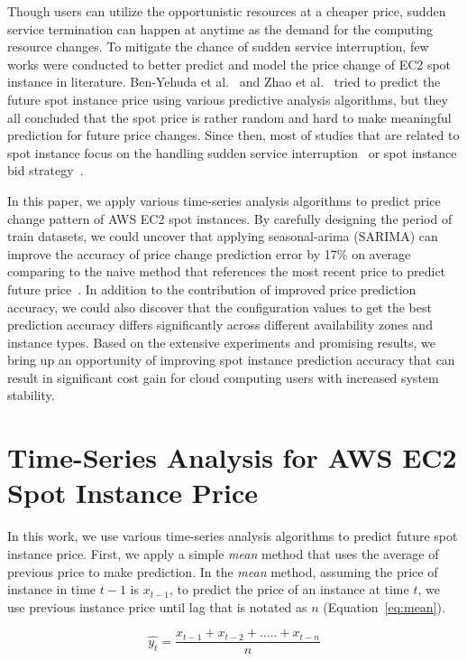 \documentclass[graybox]{svmult}
\begin{document}
Though users can utilize the opportunistic resources at a cheaper price, sudden service termination can happen at anytime as the demand for the computing resource changes. To mitigate the chance of sudden service interruption, few works were conducted to better predict and model the price change of EC2 spot instance in literature. Ben-Yehuda et al.~\cite{spot-instance-pricing-analysis} and Zhao et al.~\cite{spot-price-han-arima} tried to predict the future spot instance price using various predictive analysis algorithms, but they all concluded that the spot price is rather random and hard to make meaningful prediction for future price changes. Since then, most of studies that are related to spot instance focus on the handling sudden service interruption~\cite{tr-spark,spot-mpi-checkpoint,flint,deep-spot-cloud} or spot instance bid strategy~\cite{not-bid-cloud,how-to-bid-cloud}. 

In this paper, we apply various time-series analysis algorithms to predict price change pattern of AWS EC2 spot instances. By carefully designing the period of train datasets, we could uncover that applying seasonal-arima (SARIMA) can improve the accuracy of price change prediction error by 17\% on average comparing to the naive method that references the most recent price to predict future price~\cite{deep-spot-cloud}. In addition to the contribution of improved price prediction accuracy, we could also discover that the configuration values to get the best prediction accuracy differs significantly across different availability zones and instance types. Based on the extensive experiments and promising results, we bring up an opportunity of improving spot instance prediction accuracy that can result in significant cost gain for cloud computing users with increased system stability.

\section{Time-Series Analysis for AWS EC2 Spot Instance Price}
In this work, we use various time-series analysis algorithms to predict future spot instance price. First, we apply a simple \emph{mean} method that uses the average of previous price to make prediction. In the \emph{mean} method, assuming the price of instance in time $t-1$ is $x_{t-1}$, to predict the price of an instance at time $t$, we use previous instance price until lag that is notated as $n$ (Equation~\ref{eq:mean}).

\begin{equation}
  \hat{y_{t}} = \frac{x_{t-1} +x_{t-2}+.....+x_{t-n}}{n}
\label{eq:mean}
\end{equation} 
\end{document}
